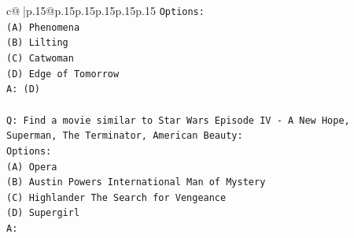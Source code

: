 \documentclass{article}
\begin{document}
{\begin{supertabular}{c@{$\;$}|p{.15\linewidth}@{}p{.15\linewidth}p{.15\linewidth}p{.15\linewidth}p{.15\linewidth}p{.15\linewidth}}
{{{\texttt{Options:} \\
\texttt{(A) Phenomena} \\
\texttt{(B) Lilting} \\
\texttt{(C) Catwoman} \\
\texttt{(D) Edge of Tomorrow} \\
\texttt{A: (D)} \\
\\ 
\texttt{Q: Find a movie similar to Star Wars Episode IV {-} A New Hope, Superman, The Terminator, American Beauty:} \\
\texttt{Options:} \\
\texttt{(A) Opera} \\
\texttt{(B) Austin Powers International Man of Mystery} \\
\texttt{(C) Highlander The Search for Vengeance} \\
\texttt{(D) Supergirl} \\
\texttt{A:} \\
            }
        }
    }
     \\ \\


\end{supertabular}}
\end{document}
